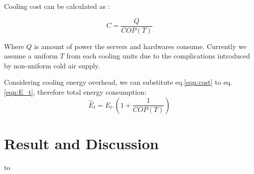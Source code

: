 \documentclass[conference]{IEEEtran}
\begin{document}
Cooling cost can be calculated as  \cite{moore2005making} :

\begin{equation}\label{eqn:cost}
C = \frac{Q}{COP(T)}
\end{equation}

Where $Q$ is amount of power the servers and hardwares consume.
Currently we assume a uniform $T$ from each cooling units due to the complications introduced by non-uniform cold air supply.

Considering cooling energy overhead, we can substitute eq.\ref{eqn:cost} to eq.\ref{eqn:E_t}, therefore total energy consumption: 
\begin{equation}
	\hat{E}_{t} = E_{t}.\left( 1+\frac{1}{COP(T)} \right)
\end{equation}


\section{Result and Discussion}\label{analysis}

\begin{table}[ht]
\caption{Numerical Simulation Parameters from \cite{Nedevschi:2008:HDC:1855610.1855618}, \cite{valancius2009greening},\cite{4509688}, and \cite{Sun:2009:POS:1542245.1542249}.}
\label{tab:simparameters}
\hbox to
\end{table}
\end{document}
